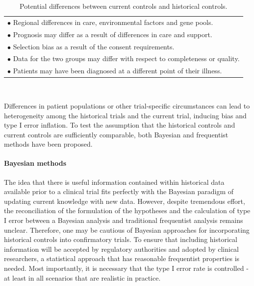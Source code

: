 \documentclass[Royal,sagev,times]{sagej}
\begin{document}
\begin{table}[h!]
\caption{Potential differences between current controls and historical controls.\cite{simmons2009} \label{Table:differences}}
\begin{tabular}{l}
\toprule
$\bullet$ Regional differences in care, environmental factors and gene pools.\\
$\bullet$ Prognosis may differ as a result of differences in care and support. \\
$\bullet$ Selection bias as a result of the consent requirements. \\ 
$\bullet$ Data for the two groups may differ with respect to completeness or quality. \\
$\bullet$ Patients may have been diagnosed at a different point of their illness. \\
\bottomrule
\end{tabular}\\[10pt]
\end{table}
Differences in patient populations or other trial-specific circumstances can lead to heterogeneity among the historical trials and the current trial, \cite{vRosmalen2018} inducing bias and type I error inflation.\cite{viele2014} To test the assumption that the historical controls and current controls are sufficiently comparable, both Bayesian and frequentist methods have been proposed. 

\paragraph{Bayesian methods}
The idea that there is useful information contained within historical data available prior to a clinical trial fits perfectly with the Bayesian paradigm of updating current knowledge with new data.\cite{lim2018} However, despite tremendous effort, the reconciliation of the formulation of the hypotheses and the calculation of type I error between a Bayesian analysis and traditional frequentist analysis remains unclear.\cite{quan2019} Therefore, one may be cautious of Bayesian approaches for incorporating historical controls into confirmatory trials.\cite{lim2018} To ensure that including historical information will be accepted by regulatory authorities and adopted by clinical researchers, a statistical approach that has reasonable frequentist properties is needed.\cite{normington2019} Most importantly, it is necessary that the type I error rate is controlled - at least in all scenarios that are realistic in practice.\cite{Mielke2018}
\end{document}
